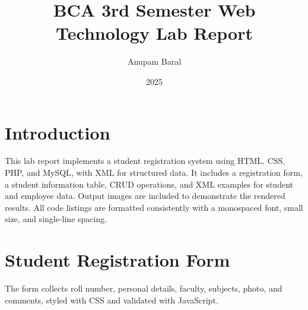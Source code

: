 \documentclass[a4paper,12pt]{article}
\title{BCA 3rd Semester Web Technology Lab Report}
\author{ Anupam Baral}
\date{ 2025}
\begin{document}
\maketitle
\tableofcontents
\newpage

\section{Introduction}
This lab report implements a student registration system using HTML, CSS, PHP, and MySQL, with XML for structured data. It includes a registration form, a student information table, CRUD operations, and XML examples for student and employee data. Output images are included to demonstrate the rendered results. All code listings are formatted consistently with a monospaced font, small size, and single-line spacing.

\section{Student Registration Form}
The form collects roll number, personal details, faculty, subjects, photo, and comments, styled with CSS and validated with JavaScript.
\end{document}
